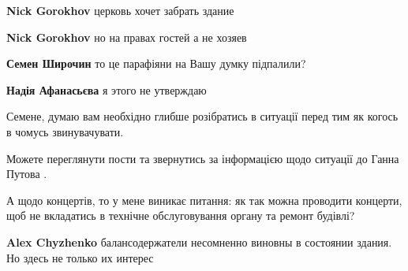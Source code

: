\begin{itemize}
\begin{itemize}
\textbf{Nick Gorokhov} церковь хочет забрать здание

 
\textbf{Nick Gorokhov} но на правах гостей а не хозяев

 
\textbf{Семен Широчин} то це парафіяни на Вашу думку підпалили?

 
\textbf{Надія Афанасьєва} я этого не утверждаю

 

Семене, думаю вам необхідно глибше розібратись в ситуації перед тим як когось в
чомусь звинувачувати.

Можете переглянути пости та звернутись за інформацією щодо ситуації до Ганна
Путова .

А щодо концертів, то у мене виникає питання: як так можна проводити концерти,
щоб не вкладатись в технічне обслуговування органу та ремонт будівлі?

 
\textbf{Alex Chyzhenko} балансодержатели несомненно виновны в состоянии здания. Но здесь не только их интерес

 


\end{itemize}
\end{itemize}
